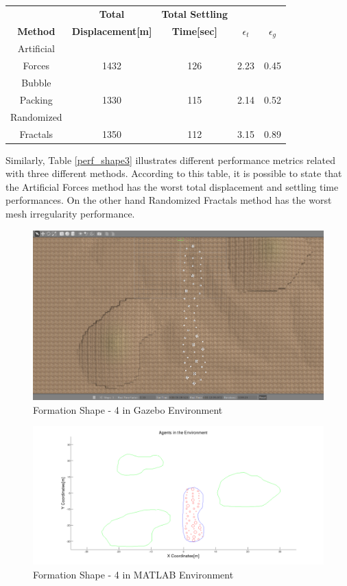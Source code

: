 \newpage				
\begin{center}
 \label{perf_shape3} 
\begin{tabular}{|c|c|c|c|c|}
					
\hline
\textbf{} & \textbf{Total}  & \textbf{Total Settling} & \textbf{} & \textbf{} \\ \textbf{Method} & \textbf{Displacement[m]} & \textbf{Time[sec]}& \textbf{$\epsilon_t$} & \textbf{$\epsilon_g$} \\
\hline
Artificial&  &  &  & \\
 Forces & 1432 & 126& 2.23 & 0.45\\
 \hline
 Bubble&  &  &  & \\
 Packing &1330 &115 &2.14 & 0.52\\
\hline
 Randomized&  &  &  & \\
 Fractals &1350 &112 &3.15 & 0.89\\
\hline
\end{tabular}
\end{center}

Similarly, Table \ref{perf_shape3} illustrates different performance metrics related with three different methods. According to this table, it is possible to state that the Artificial Forces method has the worst total displacement and settling time performances. On the other hand Randomized Fractals method has the worst mesh irregularity performance.				 
\begin{figure}[H]
\caption{Formation Shape - 4 in Gazebo Environment}
\centerline{\includegraphics[scale = 0.32]{4_Gazebo}}
\end{figure} 
			
\begin{figure}[H]
\caption{Formation Shape - 4 in MATLAB Environment}
\centerline{\includegraphics[scale = 0.32]{4}}
\end{figure} 
			
